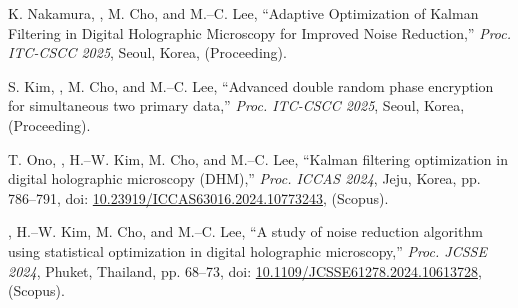 \documentclass[a4paper,9pt]{extarticle}
\begin{document}
\begin{enumerate}[label={[\arabic*]}, start=1]
    \item 
    K. Nakamura, , M. Cho, and M.--C. Lee, 
    ``Adaptive Optimization of Kalman Filtering in Digital Holographic Microscopy for Improved Noise Reduction,'' 
    \textit{Proc. ITC-CSCC 2025},
    Seoul, Korea, 
    (Proceeding).
    
    \item 
    S. Kim, , M. Cho, and M.--C. Lee, 
    ``Advanced double random phase encryption for simultaneous two primary data,'' 
    \textit{Proc. ITC-CSCC 2025},
    Seoul, Korea,
    (Proceeding).
    
    \item 
    T. Ono, , H.--W. Kim, M. Cho, and M.--C. Lee, 
    ``Kalman filtering optimization in digital holographic microscopy (DHM),'' 
    \textit{Proc. ICCAS 2024},
    Jeju, Korea, pp. 786--791, 
    doi: \href{https://doi.org/10.23919/ICCAS63016.2024.10773243}{10.23919/ICCAS63016.2024.10773243}, 
    (Scopus).

    \item 
    , H.--W. Kim, M. Cho, and M.--C. Lee, 
    ``A study of noise reduction algorithm using statistical optimization in digital holographic microscopy,'' 
    \textit{Proc. JCSSE 2024},
    Phuket, Thailand, pp. 68--73, 
    doi: \href{https://doi.org/10.1109/JCSSE61278.2024.10613728}{10.1109/JCSSE61278.2024.10613728}, 
    (Scopus).
    
\end{enumerate} 
\end{document}
